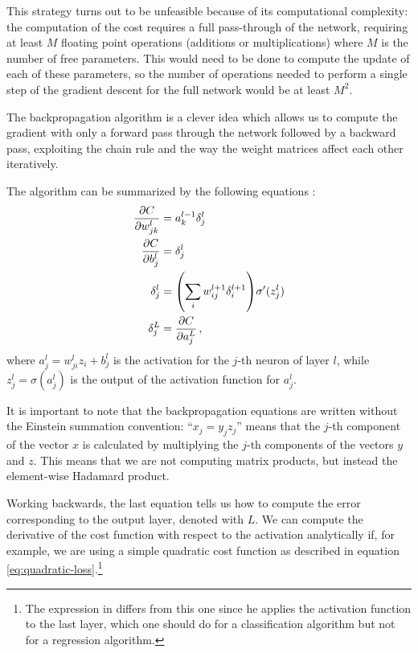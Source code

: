 \documentclass[main.tex]{subfiles}
\begin{document}
This strategy turns out to be unfeasible because of its computational complexity: the computation of the cost requires a full pass-through of the network, requiring at least \(M\) floating point operations (additions or multiplications) where \(M\) is the number of free parameters. 
This would need to be done to compute the update of each of these parameters, so the number of operations needed to perform a single step of the gradient descent for the full network would be at least \(M^2\).

The backpropagation algorithm is a clever idea which allows us to compute the gradient with only a forward pass through the network followed by a backward pass, exploiting the chain rule and the way the weight matrices affect each other iteratively. 

The algorithm can be summarized by the following equations \cite[chapter 2]{nielsenNeuralNetworksDeep2015}: 
%
\begin{subequations}
\begin{align}
\pdv{C}{w_{jk}^{l}} &= a_{k}^{l-1} \delta^{l}_{j}  \\
\pdv{C}{b_{j}^{l}} &= \delta^{l}_{j}  \\
\delta^{l}_{j} &= \qty(\sum _{i} w^{l+1}_{ij} \delta^{l+1}_i) \sigma' (z^{l}_j)  \\
\delta^{L}_j &= \pdv{C}{a_j^{L}}
\,,
\end{align}
\end{subequations}
%
where \(a^{l}_{j} = w^{l}_{ji} z_i + b_j^{l}\) is the activation for the \(j\)-th neuron of layer \(l\), while \(z^{l}_j = \sigma (a^{l}_{j})\) is the output of the activation function for \(a_{j}^{l}\).

It is important to note that the backpropagation equations are written without the Einstein summation convention: ``\(x_j = y_j z_j\)'' means that the \(j\)-th component of the vector \(x\) is calculated by multiplying the \(j\)-th components of the vectors \(y\) and \(z\). 
This means that we are not computing matrix products, but instead the element-wise Hadamard product. 

Working backwards, the last equation tells us how to compute the error corresponding to the output layer, denoted with \(L\). We can compute the derivative of the cost function with respect to the activation analytically if, for example, we are using a simple quadratic cost function as described in equation \ref{eq:quadratic-loss}.\footnote{The expression in \cite[]{nielsenNeuralNetworksDeep2015} differs from this one since he applies the activation function to the last layer, which one should do for a classification algorithm but not for a regression algorithm.}
\end{document}

